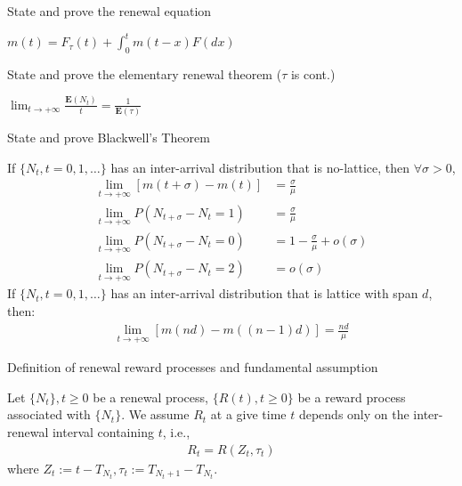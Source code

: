 \documentclass[11pt]{article}
\newcommand{\expect}[1]{\mathbf{E}(#1)}
\newcommand*{\xfield}[1]{\begin{mdframed}\centering #1\end{mdframed}\bigskip}
\newenvironment{field}{}{}
\newenvironment{note}{}{}
\begin{document}
%
\begin{note}
  \xfield{State and prove the renewal equation}
  \begin{field}
    \(m(t) = F_\tau(t) + \int_0^t m(t-x) F(dx)\)
  \end{field}
\end{note}
%
\begin{note}
  \xfield{State and prove the elementary renewal theorem (\(\tau\) is cont.)}
  \begin{field}
    \(\displaystyle \lim_{t \to +\infty} \frac{\expect{N_t}}{t} =
    \frac{1}{\expect{\tau}}\)
  \end{field}
\end{note}
%
\begin{note}
  \xfield{State and prove Blackwell's Theorem}
  \begin{field}
    If \(\{N_t, t = 0,1,\ldots\}\) has an inter-arrival distribution
    that is no-lattice, then \(\forall \sigma > 0\),
    \begin{align*}
      \lim_{t \to +\infty} [ m(t+\sigma) - m(t) ]
      & = \frac{\sigma}{\mu} \\
      \lim_{t \to +\infty} P(N_{t + \sigma} - N_t = 1)
      & = \frac{\sigma}{\mu} \\
      \lim_{t \to +\infty} P(N_{t+\sigma} - N_t = 0)
      & = 1 - \frac{\sigma}{\mu} + o(\sigma) \\
      \lim_{t \to +\infty} P(N_{t+\sigma} - N_t = 2)
      & = o(\sigma)
    \end{align*}
    If \(\{N_t, t = 0,1,\ldots\}\) has an inter-arrival distribution
    that is lattice with span \(d\), then:
    \begin{align*}
      \lim_{t \to +\infty} [ m(nd) - m((n-1)d)] = \frac{nd}{\mu}
    \end{align*}
  \end{field}
\end{note}
%
\begin{note}
  \xfield{Definition of renewal reward processes and fundamental assumption}
  \begin{field}
    Let \(\{N_t\}, t \geq 0\) be a renewal process, \(\{R(t), t
    \geq0\}\) be a reward process associated with \(\{N_t\}\). We
    assume \(R_t\) at a give time \(t\) depends only on the
    inter-renewal interval containing \(t\), i.e.,
    \begin{align*}
      R_t = R(Z_t, \tau_t)
    \end{align*}
    where \(Z_t := t - T_{N_t}, \tau_t := T_{N_t + 1} - T_{N_t}\).
  \end{field}
\end{note}
\end{document}
